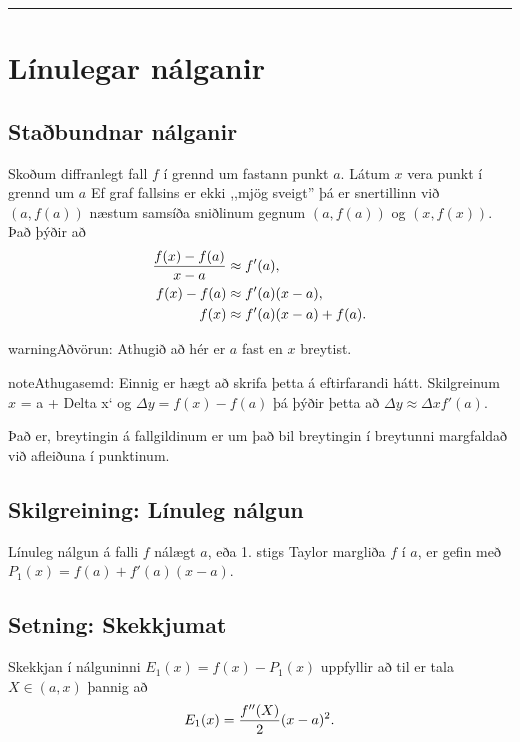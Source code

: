 \documentclass[a4paper,10pt,icelandic]{sphinxmanual}
\begin{document}
\bigskip\hrule{}\bigskip



\section{Línulegar nálganir}
\label{kafli03:linulegar-nalganir}

\subsection{Staðbundnar nálganir}
\label{kafli03:stabundnar-nalganir}
Skoðum diffranlegt fall \(f\) í grennd um fastann punkt
\(a\). Látum \(x\) vera punkt í grennd um \(a\)
Ef graf fallsins er ekki ,,mjög
sveigt” þá er snertillinn við \((a,f(a))\) næstum samsíða
sniðlinum gegnum \((a,f(a))\) og \((x,f(x))\).
Það þýðir að
\begin{gather}
\begin{split}\begin{aligned}
     \frac{f(x)-f(a)}{x-a} &\approx f'(a),\\
     f(x)-f(a) &\approx  f'(a)(x-a),\\
     f(x) &\approx f'(a)(x-a) + f(a).
\end{aligned}\end{split}\notag
\end{gather}
\begin{notice}{warning}{Aðvörun:}
Athugið að hér er \(a\) fast en \(x\) breytist.
\end{notice}

\begin{notice}{note}{Athugasemd:}
Einnig er hægt að skrifa þetta á eftirfarandi hátt.
Skilgreinum \(x\) = a + Delta x{}` og
\(\Delta y = f(x) - f(a)\) þá þýðir þetta að
\(\Delta y \approx \Delta x f'(a)\).

Það er, breytingin á fallgildinum er um það bil breytingin í
breytunni margfaldað við afleiðuna í punktinum.
\end{notice}


\subsection{Skilgreining: Línuleg nálgun}
\label{kafli03:skilgreining-linuleg-nalgun}
Línuleg nálgun á falli \(f\) nálægt \(a\), eða 1. stigs Taylor
margliða \(f\) í \(a\), er gefin með
\(P_1(x)=f(a)+f'(a)(x-a)\).


\subsection{Setning: Skekkjumat}
\label{kafli03:setning-skekkjumat}
Skekkjan í nálguninni \(E_1(x)=f(x)-P_1(x)\) uppfyllir að til er
tala \(X \in (a,x)\) þannig að
\begin{gather}
\begin{split}E_1(x)=\frac{f''(X)}{2}(x-a)^2.\end{split}\notag
\end{gather}
\end{document}
